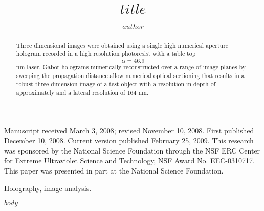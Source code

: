 \documentclass[]{IEEEphot}
\begin{document}
\title{$title$}

\author{$author$}

\affil{}  


\maketitle


\begin{receivedinfo}
  Manuscript received March 3, 2008; revised November 10, 2008. First published December 10, 2008. Current version published February 25, 2009. This research was sponsored by the National Science Foundation through the NSF ERC Center for Extreme Ultraviolet Science and Technology, NSF Award No. EEC-0310717. This paper was presented in part at the National Science Foundation.
\end{receivedinfo}

\begin{abstract}
  Three dimensional images were obtained using a single high numerical aperture hologram recorded in a high resolution photoresist with a table top $$\alpha = 46.9$$ nm laser. Gabor holograms numerically reconstructed over a range of image planes by sweeping the propagation distance allow numerical optical sectioning that results in a robust three dimension image of a test object with a resolution in depth of approximately and a lateral resolution of 164 nm. 
\end{abstract}

\begin{IEEEkeywords}
  Holography, image analysis.
\end{IEEEkeywords}

$body$
\end{document}
